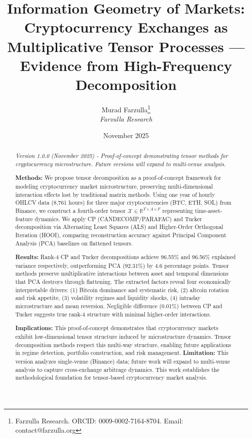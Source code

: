 \documentclass{article}
\title{\textbf{Information Geometry of Markets: Cryptocurrency Exchanges as Multiplicative Tensor Processes — Evidence from High-Frequency Decomposition}}
\author{
    Murad Farzulla\thanks{Farzulla Research. ORCID: 0009-0002-7164-8704. Email: contact@farzulla.org} \\
    \textit{Farzulla Research}
}
\date{November 2025}
\begin{document}

\maketitle

\begin{abstract}
\noindent \textit{Version 1.0.0 (November 2025) - Proof-of-concept demonstrating tensor methods for cryptocurrency microstructure. Future versions will expand to multi-venue analysis.}

\textbf{Methods:} We propose tensor decomposition as a proof-of-concept framework for modeling cryptocurrency market microstructure, preserving multi-dimensional interaction effects lost by traditional matrix methods. Using one year of hourly OHLCV data (8,761 hours) for three major cryptocurrencies (BTC, ETH, SOL) from Binance, we construct a fourth-order tensor $\mathcal{X} \in \mathbb{R}^{T \times A \times F}$ representing time-asset-feature dynamics. We apply CP (CANDECOMP/PARAFAC) and Tucker decomposition via Alternating Least Squares (ALS) and Higher-Order Orthogonal Iteration (HOOI), comparing reconstruction accuracy against Principal Component Analysis (PCA) baselines on flattened tensors.

\textbf{Results:} Rank-4 CP and Tucker decompositions achieve 96.55\% and 96.56\% explained variance respectively, outperforming PCA (92.31\%) by 4.6 percentage points. Tensor methods preserve multiplicative interactions between asset and temporal dimensions that PCA destroys through flattening. The extracted factors reveal four economically interpretable drivers: (1) Bitcoin dominance and systematic risk, (2) altcoin rotation and risk appetite, (3) volatility regimes and liquidity shocks, (4) intraday microstructure and mean reversion. Negligible difference (0.01\%) between CP and Tucker suggests true rank-4 structure with minimal higher-order interactions.

\textbf{Implications:} This proof-of-concept demonstrates that cryptocurrency markets exhibit low-dimensional tensor structure induced by microstructure dynamics. Tensor decomposition methods respect this multi-way structure, enabling future applications in regime detection, portfolio construction, and risk management. \textbf{Limitation:} This version analyzes single-venue (Binance) data; future work will expand to multi-venue analysis to capture cross-exchange arbitrage dynamics. This work establishes the methodological foundation for tensor-based cryptocurrency market analysis.
\end{abstract}
\end{document}
